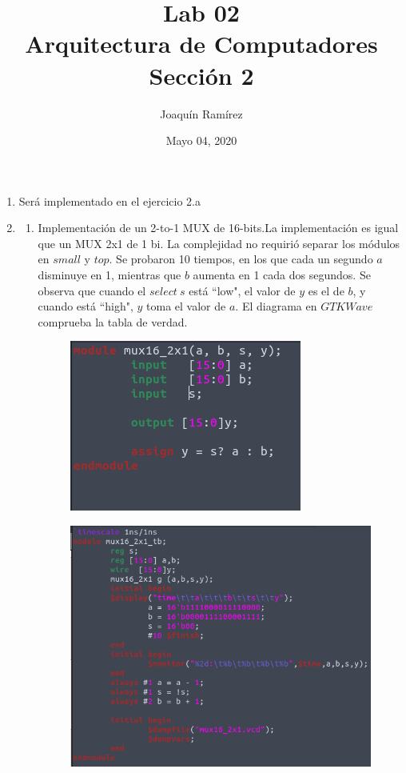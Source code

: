 \documentclass[11pt,a4paper]{article}
\title{Lab 02\\Arquitectura de Computadores \\ \Large{Sección 2}}
\author{Joaquín Ramírez}
\date{Mayo 04, 2020}
\begin{document}
\maketitle
\begin{enumerate}
\item Será implementado en el ejercicio 2.a
\item
\begin{enumerate}[label=(\alph*)]
\item Implementación de un 2-to-1 MUX de 16-bits.La implementación es igual que un MUX 2x1 de 1 bi. La complejidad no requirió separar los módulos en $small$ y $top$. Se probaron 10 tiempos, en los que cada un segundo $a$ disminuye en 1, mientras que $b$ aumenta en 1 cada dos segundos. Se observa que cuando el $select \  s$ está ``low", el valor de $y$ es el de $b$, y cuando está ``high", $y$ toma el valor de $a$. El diagrama en $GTKWave$ comprueba la tabla de verdad.
\begin{figure}[h!]
\centering
\includegraphics[scale=0.6]{16_2x1MUX_1.png} 
\end{figure}
\begin{figure}[h!]
\centering
\includegraphics[scale=0.35]{16_2x1MUX_2.png} 

\end{figure}
\end{enumerate}
\end{enumerate}
\end{document}
